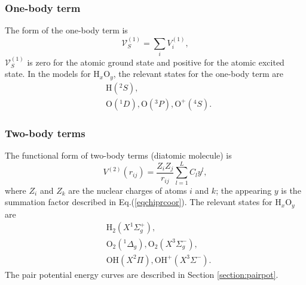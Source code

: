 \documentclass[12pt]{article}
\begin{document}
\subsubsection{One-body term}
The form of the one-body term is
\begin{equation}
    \mathcal{V}_S^{(1)} = \sum_i V_i^{(1)},
    \label{eqchipr1body}
\end{equation}
$\mathcal{V}_S^{(1)}$ is zero for the atomic ground state and positive for the atomic excited state. In the models for H$_x$O$_y$, the relevant states for the one-body term are
\begin{equation}
    \begin{split}
        &\text{H}(^2S), \\
        &\text{O}(^1D), \text{O}(^3P), \text{O}^+(^4S).
    \end{split}
\end{equation}

\subsubsection{Two-body terms}
The functional form of two-body terms (diatomic molecule) is
\begin{equation}
    V^{(2)}(r_{ij}) = \frac{Z_iZ_j}{r_{ij}}\sum^L_{l=1}C_ly^l,
\label{eqchipr2body}
\end{equation}
where $Z_i$ and $Z_k$ are the nuclear charges of atoms $i$ and $k$; the appearing $y$ is the summation factor described in Eq.(\ref{eqchiprcoor}).
The relevant states for H$_x$O$_y$ are 
\begin{equation}
    \begin{split}
        &\text{H}_2(X^1\Sigma_g^+), \\
        &\text{O}_2(^1\Delta_g), \text{O}_2(X^3\Sigma_g^-), \\ 
        &\text{OH}(X^2\Pi), \text{OH}^+(X^3\Sigma^-).
    \end{split}
\end{equation}
The pair potential energy curves are described in Section \ref{section:pairpot}.
\end{document}
